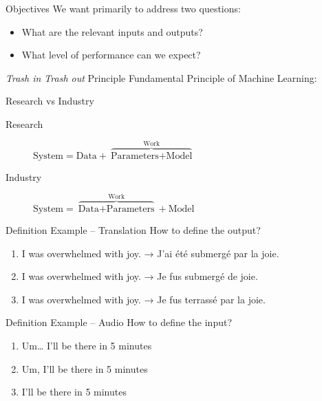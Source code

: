 \begin{frame}{Objectives}
  We want primarily to address two questions:
  \begin{itemize}
    \item What are the relevant inputs and outputs?
    \item What level of performance can we expect?
  \end{itemize}

  \hugo
\end{frame}


\begin{frame}{\textit{Trash in Trash out} Principle}
  Fundamental Principle of Machine Learning:


  \hugo
\end{frame}


\begin{frame}{Research vs Industry}
  \begin{description}
    \item[Research] $\text{System} = \text{Data} + \overbrace{\text{Parameters} + \text{Model}}^{\text{Work}}$
    \item[Industry] $\text{System} = \overbrace{\text{Data} + \text{Parameters}}^{\text{Work}} + \text{Model}$
  \end{description}

  \hugo
\end{frame}


\begin{frame}{Definition Example – Translation}
  How to define the output?
  \begin{enumerate}
    \item I was overwhelmed with joy. → J'ai été submergé par la joie.
    \item I was overwhelmed with joy. → Je fus submergé de joie.
    \item I was overwhelmed with joy. → Je fus terrassé par la joie.
  \end{enumerate}

  \hugo
\end{frame}


\begin{frame}{Definition Example – Audio}
  How to define the input?
  \begin{enumerate}
    \item Um… I'll be there in 5 minutes
    \item Um, I'll be there in 5 minutes
    \item I'll be there in 5 minutes
  \end{enumerate}

  \hugo
\end{frame}


